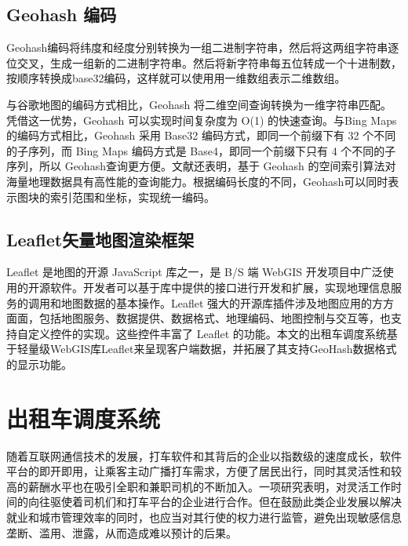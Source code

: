 \subsection{Geohash 编码}
Geohash编码将纬度和经度分别转换为一组二进制字符串，然后将这两组字符串逐位交叉，生成一组新的二进制字符串。然后将新字符串每五位转成一个十进制数，按顺序转换成base32编码，这样就可以使用用一维数组表示二维数组。\par
与谷歌地图的编码方式相比，Geohash 将二维空间查询转换为一维字符串匹配。凭借这一优势，Geohash 可以实现时间复杂度为 O(1)  的快速查询。与Bing Maps的编码方式相比，Geohash 采用 Base32 编码方式，即同一个前缀下有 32 个不同的子序列，而 Bing Maps 编码方式是 Base4，即同一个前缀下只有 4 个不同的子序列，所以 Geohash查询更方便。文献还表明，基于 Geohash 的空间索引算法对海量地理数据具有高性能的查询能力。根据编码长度的不同，Geohash可以同时表示图块的索引范围和坐标，实现统一编码。

\subsection{Leaflet矢量地图渲染框架}
Leaflet 是地图的开源 JavaScript 库之一，是 B/S 端 WebGIS 开发项目中广泛使用的开源软件。开发者可以基于库中提供的接口进行开发和扩展，实现地理信息服务的调用和地图数据的基本操作。Leaflet 强大的开源库插件涉及地图应用的方方面面，包括地图服务、数据提供、数据格式、地理编码、地图控制与交互等，也支持自定义控件的实现。这些控件丰富了 Leaflet  的功能。本文的出租车调度系统基于轻量级WebGIS库Leaflet来呈现客户端数据，并拓展了其支持GeoHash数据格式的显示功能。

\section{出租车调度系统}
随着互联网通信技术的发展，打车软件和其背后的企业以指数级的速度成长，软件平台的即开即用，让乘客主动广播打车需求，方便了居民出行，同时其灵活性和较高的薪酬水平也在吸引全职和兼职司机的不断加入。一项研究表明，对灵活工作时间的向往驱使着司机们和打车平台的企业进行合作。但在鼓励此类企业发展以解决就业和城市管理效率的同时，也应当对其行使的权力进行监管，避免出现敏感信息垄断、滥用、泄露，从而造成难以预计的后果。\par

